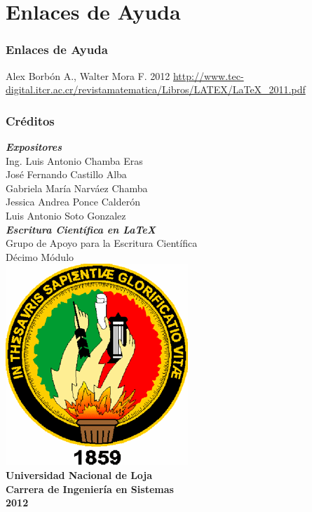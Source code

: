 \documentclass[sans serif,9pt,xcolor=dvipsnames]{beamer}%
\begin{document}
\section{Enlaces de Ayuda}
\begin{frame}
\frametitle {Enlaces de Ayuda}
\begin{thebibliography}{10}
\bibitem{  } Alex Borbón A., Walter Mora F.
 2012
\newblock 
\url{http://www.tec-digital.itcr.ac.cr/revistamatematica/Libros/LATEX/LaTeX_2011.pdf}

\end{thebibliography}
\end{frame}

\begin{frame}
\frametitle {Créditos}
	\begin{center}
		\textbf{\textit{Expositores}}\\
			Ing. Luis Antonio Chamba Eras\\
			José Fernando Castillo Alba\\
			Gabriela María Narváez Chamba\\
			Jessica Andrea Ponce Calderón\\
			Luis Antonio Soto  Gonzalez\\
\vspace{0.5 cm}
\textbf{\textit{Escritura Científica en \LaTeX }}\\
Grupo de Apoyo para la Escritura Científica\\
  Décimo Módulo\\
  \vspace{0.3 cm}
\includegraphics[height=0.5 cm]{imagenes/escudoUNL.png} \\
\textbf{Universidad Nacional de Loja\\
Carrera de Ingeniería en Sistemas\\
2012
}
	\end{center}
\end{frame}
\end{document}
